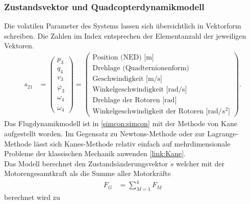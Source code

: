 \subsubsection{Zustandsvektor und Quadcopterdynamikmodell}
Die volatilen Parameter des Systems lassen sich übersichtlich in Vektorform schreiben. Die Zahlen im Index entsprechen der Elementanzahl der jeweiligen Vektoren.
\begin{align}
	s_{21} &= 
	\begin{pmatrix}
		p_3\\
		q_4\\
		v_3\\
		\dot{\varphi} _3\\
		\omega_4\\
		\dot{\omega}_4
	\end{pmatrix}
	=
	\begin{pmatrix}
		\text{Position (NED) [m]}\\
		\text{Drehlage (Quadternionenform)}\\
		\text{Geschwindigkeit [m/s]}\\
		\text{Winkelgeschwindigkeit [rad/s]}\\
		\text{Drehlage der Rotoren [rad]}\\
		\text{Winkelgeschwindigkeit der Rotoren [rad/$s^2$]}
	\end{pmatrix}.
\end{align}
Das Flugdynamikmodell ist in \ref{simcon:simcon} mit der Methode von Kane aufgestellt worden. Im Gegensatz zu Newtons-Methode oder zur Lagrange-Methode lässt sich Kanes-Methode relativ einfach auf mehrdimensionale Probleme der klassischen Mechanik anwenden \ref{link:Kane}.\\
Das Modell berechnet den Zustandsänderungsvektor $\dot{s}$ welcher mit der Motorengesamtkraft als die Summe aller Motorkräfte
\begin{align}
	F_G &= \sum_{M=1}^4 F_M
\end{align}
berechnet wird zu
